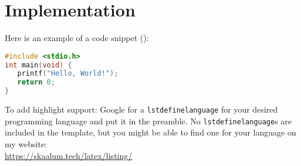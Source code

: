 \chapter{Implementation} \label{chap:implementation}

Here is an example of a code snippet ():

\begin{lstlisting}[language=C, caption={Hello World program in C.}, captionpos=b, label={snip:helloworld}]
#include <stdio.h>
int main(void) {
   printf("Hello, World!");
   return 0;
}
\end{lstlisting}

To add highlight support: Google for a \texttt{lstdefinelanguage} for your desired programming language and put it in the preamble. No \texttt{lstdefinelanguage}s are included in the template, but you might be able to find one for your language on my website:\\

\href{https://skaalum.tech/latex/listing/}{https://skaalum.tech/latex/listing/}